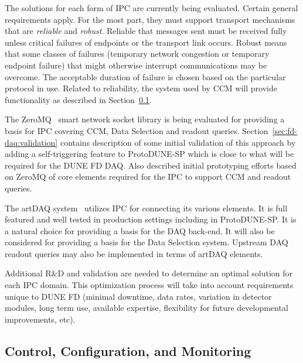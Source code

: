 The solutions for each form of IPC are currently being evaluated. 
Certain general requirements apply.
For the most part, they must support transport mechanisms that are \textit{reliable} and \textit{robust}. 
Reliable that messages sent must be received fully unless critical failures of endpoints or the transport link occurs.  Robust means that some classes of failures (temporary network congestion or temporary endpoint failure) that might otherwise interrupt communications may be overcome.
The acceptable duration of failure is chosen based on the particular protocol in use.
Related to reliability, the   system used by CCM will provide  functionality as described in Section~\ref{sec:fd-daq:design-run-control}.

The ZeroMQ~\cite{zeromq} smart network socket library is being evaluated for providing a basis for IPC covering CCM, Data Selection and readout queries.  
Section~\ref{sec:fd-daq:validation} contains description of some initial validation of this approach by adding a self-triggering feature to ProtoDUNE-SP which is close to what will be required for the DUNE FD DAQ.  Also described initial prototyping efforts based on ZeroMQ of core elements required for the IPC to support CCM and readout queries.

The artDAQ system~\cite{artdaq} utilizes IPC for connecting its various elements.  It is full featured and well tested in production settings including in ProtoDUNE-SP.  It is a natural choice for providing a basis for the DAQ back-end.  It will also be considered for providing a basis for the Data Selection system.  Upstream DAQ readout queries may also be implemented in terms of artDAQ elements.

Additional R\&D and validation are needed to determine an optimal solution for each IPC domain.  This optimization process will take into account requirements unique to DUNE FD (minimal downtime, data rates, variation in detector modules, long term use, available expertise, flexibility for future developmental improvements, etc).

\subsection{Control, Configuration, and Monitoring}
\label{sec:fd-daq:design-run-control}


